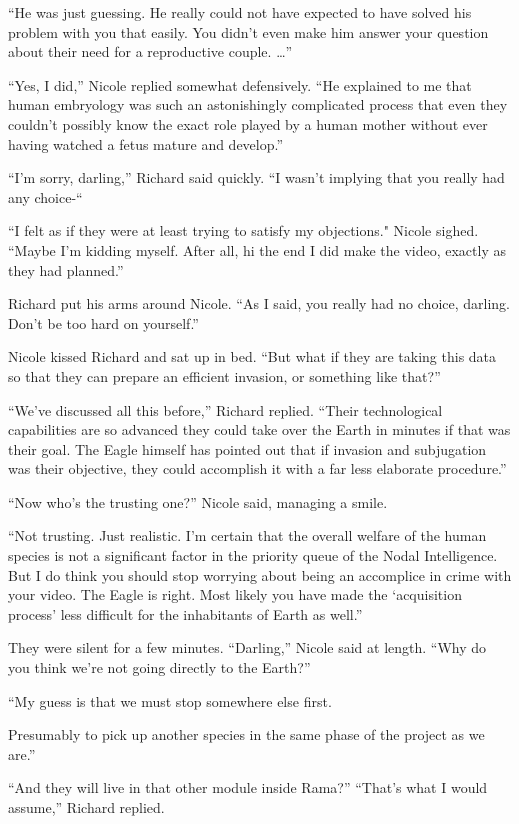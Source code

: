\documentclass[]{article}
\begin{document}
{“He was just guessing.  He really could not have expected to have solved his problem with you that easily.  You didn’t even make him answer your question about their need for a reproductive couple.  …”

“Yes, I did,” Nicole replied somewhat defensively.  “He explained to me that human embryology was such an astonishingly complicated process that even they couldn’t possibly know the exact role played by a human mother without ever having watched a fetus mature and develop.”

“I’m sorry, darling,” Richard said quickly.  “I wasn’t implying that you really had any choice-“

“I felt as if they were at least trying to satisfy my objections."  Nicole sighed.  “Maybe I’m kidding myself.  After all, hi the end I did make the video, exactly as they had planned.”

Richard put his arms around Nicole.  “As I said, you really had no choice, darling.  Don’t be too hard on yourself.”

Nicole kissed Richard and sat up in bed.  “But what if they are taking this data so that they can prepare an efficient invasion, or something like that?”

“We’ve discussed all this before,” Richard replied.  “Their technological capabilities are so advanced they could take over the Earth in minutes if that was their goal.  The Eagle himself has pointed out that if invasion and subjugation was their objective, they could accomplish it with a far less elaborate procedure.”

“Now who’s the trusting one?” Nicole said, managing a smile.

“Not trusting.  Just realistic.  I’m certain that the overall welfare of the human species is not a significant factor in the priority queue of the Nodal Intelligence.  But I do think you should stop worrying about being an accomplice in crime with your video.  The Eagle is right.  Most likely you have made the ‘acquisition process’ less difficult for the inhabitants of Earth as well.”

They were silent for a few minutes.  “Darling,” Nicole said at length.  “Why do you think we’re not going directly to the Earth?”

“My guess is that we must stop somewhere else first.

Presumably to pick up another species in the same phase of the project as we are.”

“And they will live in that other module inside Rama?” “That’s what I would assume,” Richard replied.

}
\end{document}
